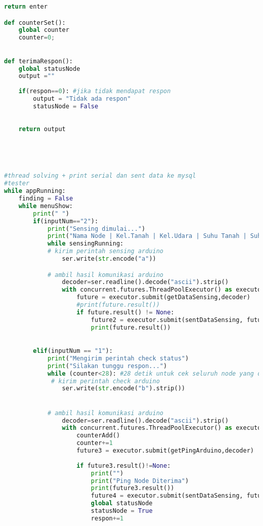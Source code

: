 \begin{lstlisting}[language=Python, caption=BaseStation.py]
    return enter

def counterSet():
    global counter
    counter=0;
    

def terimaRespon():
    global statusNode
    output =""
     
    if(respon==0): #jika tidak mendapat respon
        output = "Tidak ada respon"
        statusNode = False
 
        
    return output
    


    
    
#thread solving + print serial dan sent data ke mysql
#tester
while appRunning:
    finding = False
    while menuShow:
        print(" ")
        if(inputNum=="2"):
            print("Sensing dimulai...")
            print("Nama Node | Kel.Tanah | Kel.Udara | Suhu Tanah | Suhu Udara | pH Tanah | Status Node | Status Sensing | Waktu Sensing")
            while sensingRunning:
            # kirim perintah sensing arduino   
                ser.write(str.encode("a"))

            # ambil hasil komunikasi arduino
                decoder=ser.readline().decode("ascii").strip()
                with concurrent.futures.ThreadPoolExecutor() as executor:  
                    future = executor.submit(getDataSensing,decoder)
                    #print(future.result())
                    if future.result() != None:
                        future2 = executor.submit(sentDataSensing, future.result())
                        print(future.result())

                
        elif(inputNum == "1"):
            print("Mengirim perintah check status")
            print("Silakan tunggu respon...")
            while (counter<28): #28 detik untuk cek seluruh node yang disebar
             # kirim perintah check arduino   
                ser.write(str.encode("b").strip())


            # ambil hasil komunikasi arduino
                decoder=ser.readline().decode("ascii").strip()
                with concurrent.futures.ThreadPoolExecutor() as executor:
                    counterAdd()
                    counter+=1
                    future3 = executor.submit(getPingArduino,decoder)
                    
                    if future3.result()!=None:
                        print("")
                        print("Ping Node Diterima")
                        print(future3.result())
                        future4 = executor.submit(sentDataSensing, future3.result())
                        global statusNode
                        statusNode = True
                        respon+=1
            

\end{lstlisting}

